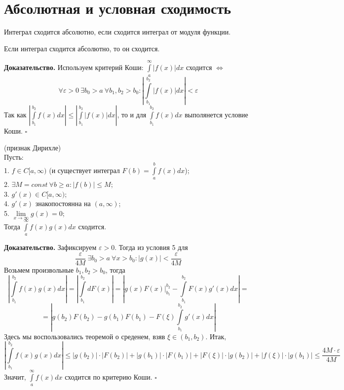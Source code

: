 \section{Абсолютная и условная сходимость}
\begin{defin}
Интеграл сходится абсолютно, если сходится интеграл от модуля функции.
\end{defin}

\begin{theor}
    Если интеграл сходится абсолютно, то он сходится.
\end{theor}
\textbf{Доказательство.}  Используем критерий Коши: 
$\int\limits_{a}^{\infty}|f(x)|dx$ сходится $\Leftrightarrow$
$$\forall \varepsilon>0~\exists b_0>a~\forall b_1,b_2>b_0:
\left| \int\limits_{b_1}^{b_2}|f(x)|dx \right|<\varepsilon$$
Так как $\left| \int\limits_{b_1}^{b_2}f(x)dx \right|\leqslant 
\left| \int\limits_{b_1}^{b_2}|f(x)|dx \right|$, то и для
$\int\limits_{b_1}^{b_2}f(x)dx$ выполянется условие Коши. $\square$ 

\begin{theor}
    (признак Дирихле)\\
    Пусть:\\
    1. $f\in C[a,\infty)$ 
    (и существует интеграл $F(b)=\int\limits_{a}^{b}f(x)dx$);\\
    2. $\exists M=const~\forall b\geqslant a:|f(b)|\leqslant M$;\\
    3. $g'(x)\in C[a,\infty)$;\\
    4. $g'(x)$ знакопостоянна на $(a,\infty)$;\\
    5. $\lim\limits_{x \to \infty}g(x)=0$;\\
    Тогда $\int\limits_{a}^{\infty}f(x)g(x)dx$ сходится. 
\end{theor}
\textbf{Доказательство.} Зафиксируем $\varepsilon>0$. Тогда из условия 5 для
$$\frac{\varepsilon}{4M}~\exists b_0>a~\forall x>b_0:|g(x)|<
\frac{\varepsilon}{4M}$$
Возьмем произвольные $b_1,b_2>b_0$, тогда 
$$\left|\int\limits_{b_1}^{b_2}f(x)g(x)dx\right| =
\left|\int\limits_{b_1}^{b_2}dF(x)\right| = 
\left| g(x)F(x)\bigg|^{b_2}_{b_1} - \int\limits_{b_1}^{b_2}F(x)g'(x)dx\right|= 
$$
$$
= \left|g(b_2)F(b_2) - g(b_1)F(b_1) - F(\xi)\int\limits_{b_1}^{b_2}g'(x)dx
\right|$$ 
Здесь мы воспользовались теоремой о среденем, взяв $\xi\in(b_1,b_2)$. 
Итак, 
$$ \left| \int\limits_{b_1}^{b_2} f(x)g(x)dx \right|\leqslant 
|g(b_2)|\cdot |F(b_2)|+|g(b_1)|\cdot |F(b_1)|+|F(\xi)|\cdot |g(b_2)|+
|f(\xi)|\cdot |g(b_1)|\leqslant\frac{4M\cdot \varepsilon}{4M}$$ 
Значит, $\int\limits_{a}^{\infty}f(x)dx$ сходится по критерию Коши. $\square$ 

